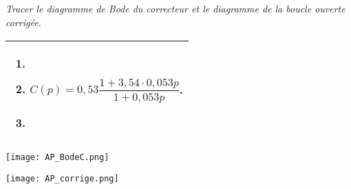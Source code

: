 \begin{multicols}{2}
\subparagraph{}\textit{Tracer le diagramme de Bode du correcteur et le diagramme de la boucle ouverte corrigée.}
\ifcolle
\else
\noindent
\begin{tabular}{|p{.9\linewidth}|}
\hline
\begin{enumerate}
\item $\quad$
\item $C(p)=0,53\dfrac{1+3,54 \cdot 0,053  p}{1+0,053 p}$.
\item $\quad$
\end{enumerate}\\
\hline
\end{tabular}

\fi

\ifprof
\else
\end{multicols}
\fi

\ifprof
\begin{center}
\texttt{[image: AP\_BodeC.png]}

\texttt{[image: AP\_corrige.png]}
\end{center}

\fi

\ifprof
\else
\begin{center}

\end{center}

\fi


%